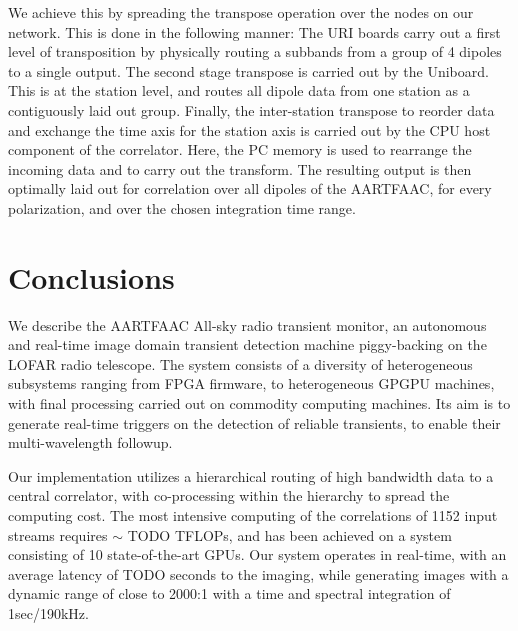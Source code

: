 \documentclass{ws-jai}
\begin{document}
We  achieve this  by spreading  the transpose  operation over  the nodes  on our
network. This is done in the following  manner: The URI boards carry out a first
level  of transposition  by physically  routing  a subbands  from a  group of  4
dipoles to a  single output.  The second  stage transpose is carried  out by the
Uniboard.  This  is at the  station level, and routes  all dipole data  from one
station as a contiguously laid  out group.  Finally, the inter-station transpose
to reorder data and  exchange the time axis for the station  axis is carried out
by the  CPU host component  of the  correlator. Here, the  PC memory is  used to
rearrange the incoming data and to carry out the transform. The resulting output
is then optimally laid out for correlation over all dipoles of the AARTFAAC, for
every polarization, and over the chosen integration time range.


\section {\label{sec:conclusion} Conclusions}
We  describe the  AARTFAAC All-sky  radio transient  monitor, an  autonomous and
real-time image  domain transient detection  machine piggy-backing on  the LOFAR
radio telescope. The  system consists of a diversity  of heterogeneous subsystems
ranging  from  FPGA  firmware,  to   heterogeneous  GPGPU  machines,  with  final
processing carried out on commodity computing  machines.  Its aim is to generate
real-time  triggers on  the detection  of reliable  transients, to  enable their
multi-wavelength followup.

Our implementation utilizes  a hierarchical routing of high bandwidth  data to a
central  correlator,  with co-processing  within  the  hierarchy to  spread  the
computing cost.  The most intensive computing  of the correlations of 1152 input
streams requires $\sim$  TODO TFLOPs, and has been achieved on  a system consisting
of 10 state-of-the-art GPUs.  Our system  operates in real-time, with an average
latency of TODO  seconds to the imaging, while generating  images with a dynamic
range of close to 2000:1 with a time and spectral integration of 1sec/190kHz.\\
\end{document}
